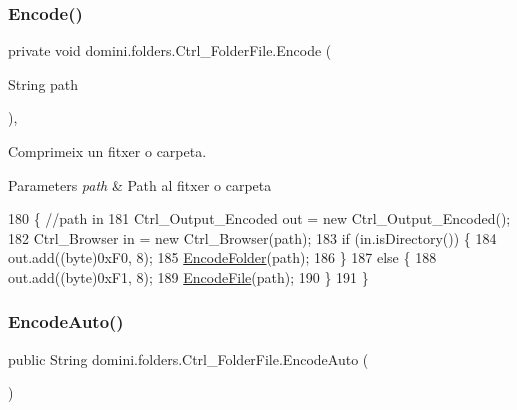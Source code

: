 \subsubsection{\texorpdfstring{Encode()}{Encode()}\hspace{0.1cm}{\footnotesize\ttfamily [2/2]}}
{\footnotesize\ttfamily private void domini.\+folders.\+Ctrl\+\_\+\+Folder\+File.\+Encode (\begin{DoxyParamCaption}\item[{String}]{path }\end{DoxyParamCaption})\hspace{0.3cm}{\ttfamily [inline]}, {\ttfamily [private]}}



Comprimeix un fitxer o carpeta. 


\begin{DoxyParams}{Parameters}
{\em path} & Path al fitxer o carpeta \\
\hline
\end{DoxyParams}

\begin{DoxyCode}
180                                      \{ \textcolor{comment}{//path in}
181         Ctrl\_Output\_Encoded out = \textcolor{keyword}{new} Ctrl\_Output\_Encoded();
182         Ctrl\_Browser in = \textcolor{keyword}{new} Ctrl\_Browser(path);
183         \textcolor{keywordflow}{if} (in.isDirectory()) \{
184             out.add((byte)0xF0, 8);
185             \hyperlink{classdomini_1_1folders_1_1Ctrl__FolderFile_a6b18175639009f0186307710fb88a18f}{EncodeFolder}(path);
186         \}
187         \textcolor{keywordflow}{else} \{
188             out.add((byte)0xF1, 8);
189             \hyperlink{classdomini_1_1folders_1_1Ctrl__FolderFile_a0b2b642b6c23124539d0306955be7f0c}{EncodeFile}(path);
190         \}
191     \}
\end{DoxyCode}
\mbox{\label{classdomini_1_1folders_1_1Ctrl__FolderFile_aa88b27fc271590c8c16642db5c1bb329}} 
\subsubsection{\texorpdfstring{Encode\+Auto()}{EncodeAuto()}}
{\footnotesize\ttfamily public String domini.\+folders.\+Ctrl\+\_\+\+Folder\+File.\+Encode\+Auto (\begin{DoxyParamCaption}{ }\end{DoxyParamCaption})\hspace{0.3cm}{\ttfamily [inline]}}



